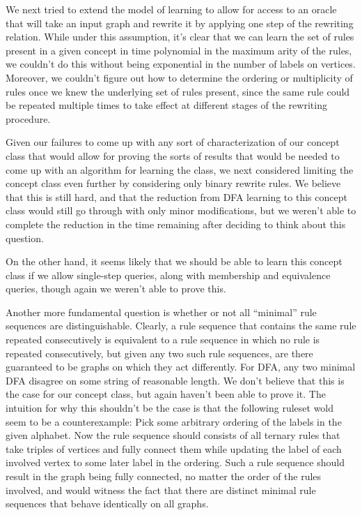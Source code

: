 \documentclass[]{article}
\begin{document}
We next tried to extend the model of learning to allow for access to an oracle that will take an input graph and rewrite it by applying one step of the rewriting relation. While under this assumption, it's clear that we can learn the set of rules present in a given concept in time polynomial in the maximum arity of the rules, we couldn't do this without being exponential in the number of labels on vertices. Moreover, we couldn't figure out how to determine the ordering or multiplicity of rules once we knew the underlying set of rules present, since the same rule could be repeated multiple times to take effect at different stages of the rewriting procedure.

Given our failures to come up with any sort of characterization of our concept class that would allow for proving the sorts of results that would be needed to come up with an algorithm for learning the class, we next considered limiting the concept class even further by considering only binary rewrite rules. We believe that this is still hard, and that the reduction from DFA learning to this concept class would still go through with only minor modifications, but we weren't able to complete the reduction in the time remaining after deciding to think about this question. 

On the other hand, it seems likely that we should be able to learn this concept class if we allow single-step queries, along with membership and equivalence queries, though again we weren't able to prove this.

Another more fundamental question is whether or not all ``minimal'' rule sequences are distinguishable. Clearly, a rule sequence that contains the same rule repeated consecutively is equivalent to a rule sequence in which no rule is repeated consecutively, but given any two such rule sequences, are there guaranteed to be graphs on which they act differently. For DFA, any two minimal DFA disagree on some string of reasonable length. We don't believe that this is the case for our concept class, but again haven't been able to prove it. The intuition for why this shouldn't be the case is that the following ruleset wold seem to be a counterexample: Pick some arbitrary ordering of the labels in the given alphabet. Now the rule sequence should consists of all ternary rules that take triples of vertices and fully connect them while updating the label of each involved vertex to some later label in the ordering. Such a rule sequence should result in the graph being fully connected, no matter the order of the rules involved, and would witness the fact that there are distinct minimal rule sequences that behave identically on all graphs.
\end{document}
